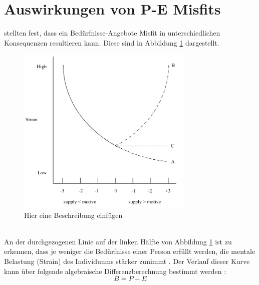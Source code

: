 \section{Auswirkungen von P-E Misfits}
\label{ch:personEnvironmentFit:auswirkungenErhoehterAngebote}
\textcite{mechanismsOfJobStressAndStrain:1982} stellten fest, dass ein Bedürfnisse-Angebote Misfit in unterschiedlichen Konsequenzen resultieren kann. Diese sind in Abbildung \ref{fig:personEnvironmentFit:auswirkungenErhoehterAngebote:abb1} dargestellt.\\
\begin{figure}[h]
	\centering
	\includegraphics[width=0.75\textwidth]{gfx/ueberschuss_supply_motive.png}
	\caption{Hier eine Beschreibung einfügen \cite[S. 23]{edwards:2008}}
	\label{fig:personEnvironmentFit:auswirkungenErhoehterAngebote:abb1}
\end{figure}\\
An der durchgezogenen Linie auf der linken Hälfte von Abbildung \ref{fig:personEnvironmentFit:auswirkungenErhoehterAngebote:abb1} ist zu erkennen, dass je weniger die Bedürfnisse einer Person erfüllt werden, die mentale Belastung (Strain) des Individuums stärker zunimmt \cite{mechanismsOfJobStressAndStrain:1982}. Der Verlauf dieser Kurve kann über folgende algebraische Differenzberechnung bestimmt werden \cite[S. 2]{edwards:1993}:
\begin{equation}
	B = P - E
	\label{fig:personEnvironmentFit:auswirkungenErhoehterAngebote:formel1}
\end{equation}
